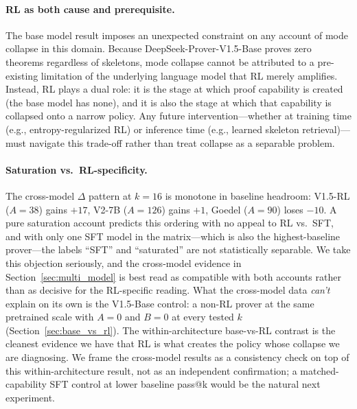 \documentclass{article}
\begin{document}
\paragraph{RL as both cause and prerequisite.}
The base model result imposes an unexpected constraint on any account of mode collapse in this domain. Because DeepSeek-Prover-V1.5-Base proves zero theorems regardless of skeletons, mode collapse cannot be attributed to a pre-existing limitation of the underlying language model that RL merely amplifies. Instead, RL plays a dual role: it is the stage at which proof capability is created (the base model has none), and it is also the stage at which that capability is collapsed onto a narrow policy. Any future intervention---whether at training time (e.g., entropy-regularized RL) or inference time (e.g., learned skeleton retrieval)---must navigate this trade-off rather than treat collapse as a separable problem.

\paragraph{Saturation vs.\ RL-specificity.}
The cross-model $\Delta$ pattern at $k{=}16$ is monotone in baseline headroom: V1.5-RL ($A=38$) gains $+17$, V2-7B ($A=126$) gains $+1$, Goedel ($A=90$) loses $-10$. A pure saturation account predicts this ordering with no appeal to RL vs.\ SFT, and with only one SFT model in the matrix---which is also the highest-baseline prover---the labels ``SFT'' and ``saturated'' are not statistically separable. We take this objection seriously, and the cross-model evidence in Section~\ref{sec:multi_model} is best read as compatible with both accounts rather than as decisive for the RL-specific reading. What the cross-model data \emph{can't} explain on its own is the V1.5-Base control: a non-RL prover at the same pretrained scale with $A=0$ and $B=0$ at every tested $k$ (Section~\ref{sec:base_vs_rl}). The within-architecture base-vs-RL contrast is the cleanest evidence we have that RL is what creates the policy whose collapse we are diagnosing. We frame the cross-model results as a consistency check on top of this within-architecture result, not as an independent confirmation; a matched-capability SFT control at lower baseline pass@k would be the natural next experiment.
\end{document}
